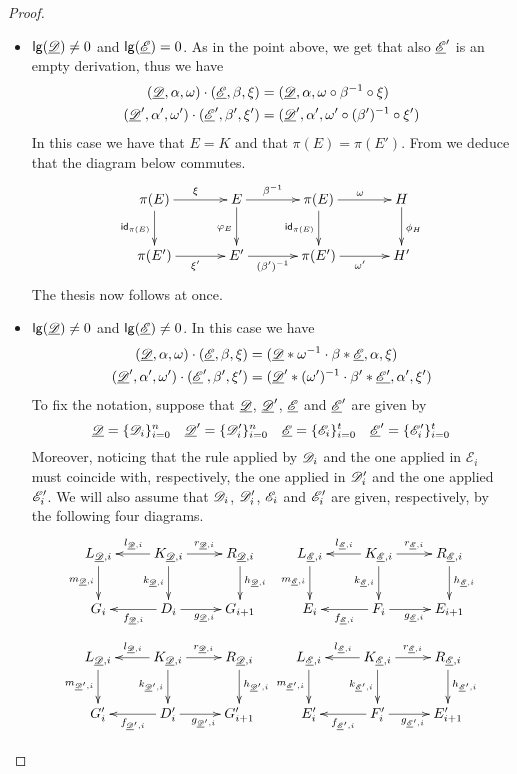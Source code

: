 \begin{proof}
\begin{itemize}
\item $\mathsf{lg}(\underline{\mathscr{D}})\neq 0$ and $\mathsf{lg}(\underline{\mathscr{E}})= 0$. As in the point above, we get that also $\underline{\mathscr{E}}'$  is an empty derivation, thus we have
\begin{align*}
	(\underline{\mathscr{D}}, \alpha, \omega)\cdot (\underline{\mathscr{E}}, \beta, \xi)&=(\underline{\mathscr{D}},  \alpha, \omega \circ \beta^{-1}\circ \xi)\\
	(\underline{\mathscr{D}}', \alpha', \omega')\cdot (\underline{\mathscr{E}}', \beta', \xi')&=(\underline{\mathscr{D}}',  \alpha', \omega' \circ (\beta')^{-1}\circ \xi')
\end{align*}
In this case we have that $E=K$ and that $\pi(E)=\pi(E')$. From  we deduce that the diagram below commutes.
\[\xymatrix@C=35pt{\pi(E) \ar[r]^{\xi} \ar[d]_{\id{\pi(E)}}& E  \ar[d]_{\varphi_E}\ar[r]^-{\beta^{-1}} & \pi(E) \ar[d]_{\id{\pi(E)}} \ar[r]^{\omega}& H \ar[d]^{\phi_H}\\\pi(E') \ar[r]_{\xi'}& E' \ar[r]_-{(\beta')^{-1}} & \pi(E') \ar[r]_{\omega'} & H'}\]
The thesis now follows at once.
	\item $\mathsf{lg}(\underline{\mathscr{D}})\neq 0$ and $\mathsf{lg}(\underline{\mathscr{E}})\neq 0$. In this case we have
	\begin{align*}
		(\underline{\mathscr{D}}, \alpha, \omega)\cdot (\underline{\mathscr{E}}, \beta, \xi)&=(\underline{\mathscr{D}}*\omega^{-1}\cdot \beta*\underline{\mathscr{E}}, \alpha, \xi)\\
		(\underline{\mathscr{D}}', \alpha', \omega')\cdot (\underline{\mathscr{E}}', \beta', \xi')&=(\underline{\mathscr{D}}'*(\omega')^{-1}\cdot \beta'*\underline{\mathscr{E'}}, \alpha', \xi')
	\end{align*}
 To fix the notation, suppose that $\underline{\mathscr{D}}$, $\underline{\mathscr{D}}'$, $\underline{\mathscr{E}}$ and $\underline{\mathscr{E}}'$ are given by
	\[\underline{\mathscr{D}}=\{\mathscr{D}_i\}_{i=0}^n \quad \underline{\mathscr{D}}'=\{\mathscr{D}'_i\}_{i=0}^n \quad \underline{\mathscr{E}}=\{\mathscr{E}_i\}_{i=0}^t \quad \underline{\mathscr{E}}'=\{\mathscr{E}'_i\}_{i=0}^t\]
	Moreover, noticing that the rule applied by $\mathscr{D}_i$ and the one applied in $\mathcal{E}_i$  must coincide with, respectively, the one applied in $\mathscr{D}'_i$ and the one applied $\mathscr{E}'_i$. We will also assume that $\mathscr{D}_i$, $\mathscr{D}'_i$, $\mathscr{E}_i$ and $\mathscr{E}'_i$ are given, respectively, by the following four diagrams. 
	\[\xymatrix{L_{\der{D},i} \ar[d]_{m_{\der{D}, i}}& K_{\der{D},i} \ar[d]_{k_{\der{D}, i}} \ar[r]^{r_{\der{D},i}} \ar[l]_{l_{\der{D},i}} & R_{\der{D},i}\ar[d]^{h_{\der{D}, i}} &L_{\der{E},i} \ar[d]_{m_{\der{E}, i}}& K_{\der{E},i} \ar[d]_{k_{\der{E}, i}} \ar[r]^{r_{\der{E},i}} \ar[l]_{l_{\der{E},i}} & R_{\der{E},i}\ar[d]^{h_{\der{E}, i}} \\G_i & D_i \ar[r]_{g_{\der{D},i}} \ar[l]^{f_{\der{D},i}} & G_{i+1} & E_i & F_i\ar[r]_{g_{\der{E},i}} \ar[l]^{f_{\der{E},i}}  & E_{i+1}}\]
	\[\xymatrix{L_{\der{D},i} \ar[d]_{m_{\der{D}', i}}& K_{\der{D},i} \ar[d]_{k_{\der{D}', i}} \ar[r]^{r_{\der{D},i}} \ar[l]_{l_{\der{D},i}} & R_{\der{D},i}\ar[d]^{h_{\der{D}', i}} &L_{\der{E},i} \ar[d]_{m_{\der{E}', i}}& K_{\der{E},i} \ar[d]_{k_{\der{E}', i}} \ar[r]^{r_{\der{E},i}} \ar[l]_{l_{\der{E},i}} & R_{\der{E},i}\ar[d]^{h_{\der{E}', i}} \\G'_i & D'_i \ar[r]_{g_{\der{D}',i}} \ar[l]^{f_{\der{D}',i}} & G'_{i+1} & E'_i & F'_i\ar[r]_{g_{\der{E}',i}} \ar[l]^{f_{\der{E}',i}}  & E'_{i+1}}\]
	

\end{itemize}
\end{proof}

